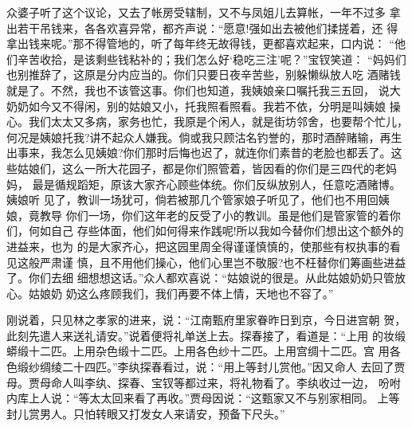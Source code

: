 众婆子听了这个议论，又去了帐房受辖制，又不与凤姐儿去算帐，一年不过多
拿出若干吊钱来，各各欢喜异常，都齐声说：“愿意!强如出去被他们揉搓着，还
得拿出钱来呢。”那不得管地的，听了每年终无故得钱，更都喜欢起来，口内说：
“他们辛苦收拾，是该剩些钱粘补的；我们怎么好‘稳吃三注’呢？”宝钗笑道：
“妈妈们也别推辞了，这原是分内应当的。你们只要日夜辛苦些，别躲懒纵放人吃
酒赌钱就是了。不然，我也不该管这事。你们也知道，我姨娘亲口嘱托我三五回，
说大奶奶如今又不得闲，别的姑娘又小，托我照看照看。我若不依，分明是叫姨娘
操心。我们太太又多病，家务也忙，我原是个闲人，就是街坊邻舍，也要帮个忙儿，
何况是姨娘托我?讲不起众人嫌我。倘或我只顾沽名钓誉的，那时酒醉赌输，再生
出事来，我怎么见姨娘?你们那时后悔也迟了，就连你们素昔的老脸也都丢了。这
些姑娘们，这么一所大花园子，都是你们照管着，皆因看的你们是三四代的老妈妈，
最是循规蹈矩，原该大家齐心顾些体统。你们反纵放别人，任意吃酒赌博。姨娘听
见了，教训一场犹可，倘若被那几个管家娘子听见了，他们也不用回姨娘，竟教导
你们一场，你们这年老的反受了小的教训。虽是他们是管家管的着你们，何如自己
存些体面，他们如何得来作践呢!所以我如今替你们想出这个额外的进益来，也为
的是大家齐心，把这园里周全得谨谨慎慎的，使那些有权执事的看见这般严肃谨
慎，且不用他们操心，他们心里岂不敬服?也不枉替你们筹画些进益了。你们去细
细想想这话。”众人都欢喜说：“姑娘说的很是。从此姑娘奶奶只管放心。姑娘奶
奶这么疼顾我们，我们再要不体上情，天地也不容了。”

刚说着，只见林之孝家的进来，说：“江南甄府里家眷昨日到京，今日进宫朝
贺，此刻先遣人来送礼请安。”说着便将礼单送上去。探春接了，看道是：“上用
的妆缎蟒缎十二匹。上用杂色缎十二匹。上用各色纱十二匹。上用宫绸十二匹。宫
用各色缎纱绸绫二十四匹。”李纨探春看过，说：“用上等封儿赏他。”因又命人
去回了贾母。贾母命人叫李纨、探春、宝钗等都过来，将礼物看了。李纨收过一边，
吩咐内库上人说：“等太太回来看了再收。”贾母因说：“这甄家又不与别家相同。
上等封儿赏男人。只怕转眼又打发女人来请安，预备下尺头。”

